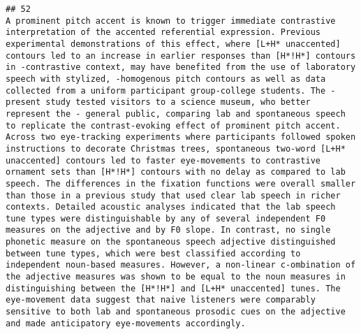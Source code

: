 \documentclass[
  english,
  man]{apa6}
\begin{document}
\begin{verbatim}
## 52                                                                                                                                                                                                                                                                                                                                                                                                                                                                                                                                                                                                                                                                                                                                                                                                      A prominent pitch accent is known to trigger immediate contrastive interpretation of the accented referential expression. Previous experimental demonstrations of this effect, where [L+H* unaccented] contours led to an increase in earlier responses than [H*!H*] contours in -contrastive context, may have benefited from the use of laboratory speech with stylized, -homogenous pitch contours as well as data collected from a uniform participant group-college students. The -present study tested visitors to a science museum, who better represent the - general public, comparing lab and spontaneous speech to replicate the contrast-evoking effect of prominent pitch accent. Across two eye-tracking experiments where participants followed spoken instructions to decorate Christmas trees, spontaneous two-word [L+H* unaccented] contours led to faster eye-movements to contrastive ornament sets than [H*!H*] contours with no delay as compared to lab speech. The differences in the fixation functions were overall smaller than those in a previous study that used clear lab speech in richer contexts. Detailed acoustic analyses indicated that the lab speech tune types were distinguishable by any of several independent F0 measures on the adjective and by F0 slope. In contrast, no single phonetic measure on the spontaneous speech adjective distinguished between tune types, which were best classified according to independent noun-based measures. However, a non-linear c-ombination of the adjective measures was shown to be equal to the noun measures in distinguishing between the [H*!H*] and [L+H* unaccented] tunes. The eye-movement data suggest that naive listeners were comparably sensitive to both lab and spontaneous prosodic cues on the adjective and made anticipatory eye-movements accordingly.

\end{verbatim}
\end{document}
